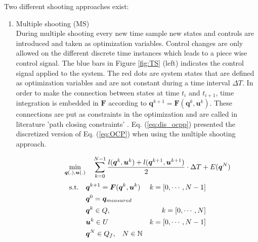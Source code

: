 Two different shooting approaches exist:\\
\begin{enumerate}
	\item Multiple shooting (MS)\\
	During multiple shooting every new time sample new states and controls are introduced and taken as optimization variables.
	Control changes are only allowed on the different discrete time instances which leads to a piece wise control signal. The blue bars in Figure \ref{fig:TS} (left) indicates the control signal applied to the system.  The red dots are system states that are defined as optimization variables and are not constant during a time interval $\Delta T$. In order to make the connection between states at time $t_i$ and $t_{i+1}$, time integration is embedded in $\bm{F}$ according to $\bm{q}^{k+1} = \bm{F}(\bm{q}^k, \bm{u}^k)$. These connections are put as constraints in the optimization and are called in literature 'path closing constraints' \cite{Gillis2019}. Eq. (\ref{eq:dis_ocpp}) presented the discretized version of Eq. (\ref{eq:OCP}) when using the multiple shooting approach. 

	\begin{equation*}
	\label{eq:OCP_dis}
	\begin{aligned}
	\hspace{10mm}\min_{\bm{q}(.),\bm{u}(.)} \quad & \sum_{k = 0}^{N-1}\frac{l(\bm{q}^{k},\bm{u}^{k})+l(\bm{q}^{k+1},\bm{u}^{k+1})}{2}\cdot \Delta T + E(\bm{q}^{N}) \\
	\end{aligned}
	\end{equation*}
	\begin{equation}\label{eq:dis_ocpp}
	\begin{aligned}
	\textrm{s.t.} \quad & \bm{q}^{k+1} = \bm{F}(\bm{q}^{k}, \bm{u}^{k}) & k = [0,\cdots, N-1]\\
	& \bm{q}^{0}= \bm{q}_{measured} \\
	& \bm{q}^{k}\in Q,\hspace{3 mm} & k = [0,\cdots, N]\\
	& \bm{u}^{k}\in U \hspace{3 mm} & k = [0,\cdots, N-1]\\
	& \bm{q}^{N}\in Q_f,\hspace{3 mm} N \in \mathbb{N}
	\end{aligned}
	\end{equation}


\end{enumerate}
